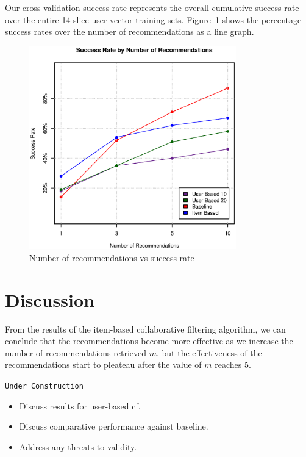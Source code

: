 \documentclass{article} %
\begin{document}
Our cross validation success rate represents the overall cumulative success rate over the entire 14-slice user vector training sets. Figure~\ref{fig:results} shows the percentage success rates over the number of recommendations as a line graph.

\begin{figure}[h]
\begin{center}
\includegraphics[width=0.8\textwidth]{graph}
\end{center}
\caption{Number of recommendations vs success rate}
\label{fig:results}
\end{figure}

\section{Discussion}
From the results of the item-based collaborative filtering algorithm, we can conclude that the recommendations become more effective as we increase the number of recommendations retrieved $m$, but the effectiveness of the recommendations start to pleateau after the value of $m$ reaches 5.
\begin{center}
   \texttt{Under Construction}
   \begin{itemize}
      \item Discuss results for user-based cf.
      \item Discuss comparative performance against baseline.
      \item Address any threats to validity.
   \end{itemize}
\end{center}
\end{document}
